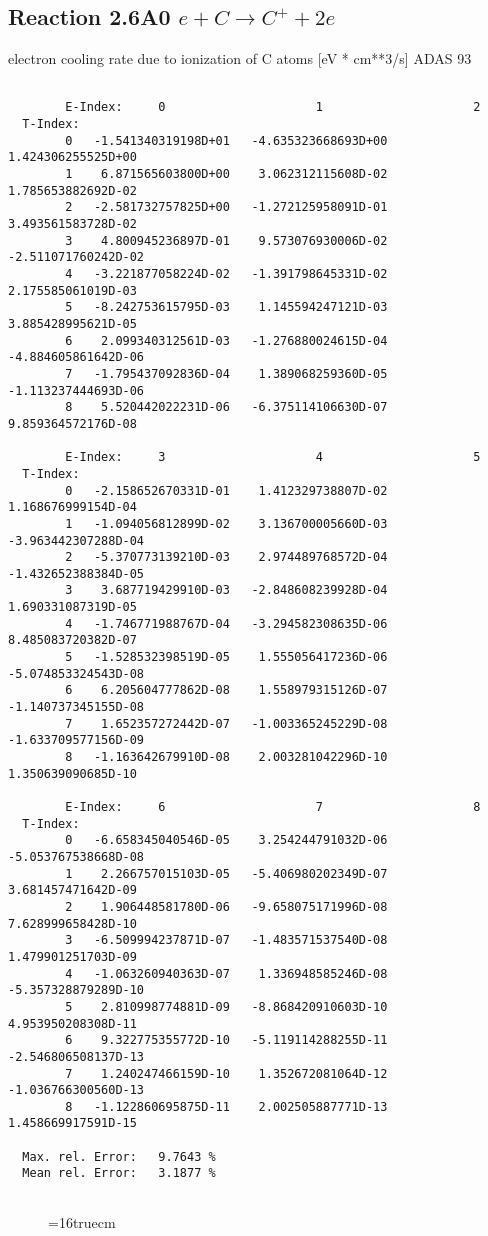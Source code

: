 \documentclass[12pt,dvipdfmx]{article}
\begin{document}
\subsection{
  Reaction 2.6A0  $e + C  \rightarrow C^+   + 2e $
}
electron cooling rate due to ionization of C atoms [eV * cm**3/s]
ADAS 93

\begin{small}\begin{verbatim}

        E-Index:     0                     1                     2
  T-Index:
        0   -1.541340319198D+01   -4.635323668693D+00    1.424306255525D+00
        1    6.871565603800D+00    3.062312115608D-02    1.785653882692D-02
        2   -2.581732757825D+00   -1.272125958091D-01    3.493561583728D-02
        3    4.800945236897D-01    9.573076930006D-02   -2.511071760242D-02
        4   -3.221877058224D-02   -1.391798645331D-02    2.175585061019D-03
        5   -8.242753615795D-03    1.145594247121D-03    3.885428995621D-05
        6    2.099340312561D-03   -1.276880024615D-04   -4.884605861642D-06
        7   -1.795437092836D-04    1.389068259360D-05   -1.113237444693D-06
        8    5.520442022231D-06   -6.375114106630D-07    9.859364572176D-08

        E-Index:     3                     4                     5
  T-Index:
        0   -2.158652670331D-01    1.412329738807D-02    1.168676999154D-04
        1   -1.094056812899D-02    3.136700005660D-03   -3.963442307288D-04
        2   -5.370773139210D-03    2.974489768572D-04   -1.432652388384D-05
        3    3.687719429910D-03   -2.848608239928D-04    1.690331087319D-05
        4   -1.746771988767D-04   -3.294582308635D-06    8.485083720382D-07
        5   -1.528532398519D-05    1.555056417236D-06   -5.074853324543D-08
        6    6.205604777862D-08    1.558979315126D-07   -1.140737345155D-08
        7    1.652357272442D-07   -1.003365245229D-08   -1.633709577156D-09
        8   -1.163642679910D-08    2.003281042296D-10    1.350639090685D-10

        E-Index:     6                     7                     8
  T-Index:
        0   -6.658345040546D-05    3.254244791032D-06   -5.053767538668D-08
        1    2.266757015103D-05   -5.406980202349D-07    3.681457471642D-09
        2    1.906448581780D-06   -9.658075171996D-08    7.628999658428D-10
        3   -6.509994237871D-07   -1.483571537540D-08    1.479901251703D-09
        4   -1.063260940363D-07    1.336948585246D-08   -5.357328879289D-10
        5    2.810998774881D-09   -8.868420910603D-10    4.953950208308D-11
        6    9.322775355772D-10   -5.119114288255D-11   -2.546806508137D-13
        7    1.240247466159D-10    1.352672081064D-12   -1.036766300560D-13
        8   -1.122860695875D-11    2.002505887771D-13    1.458669917591D-15

  Max. rel. Error:   9.7643 %
  Mean rel. Error:   3.1877 %


\end{verbatim}\end{small}
\begin{figure} \label{2.6il}
\epsfxsize=16truecm
\end{figure}
\newpage
\end{document}
